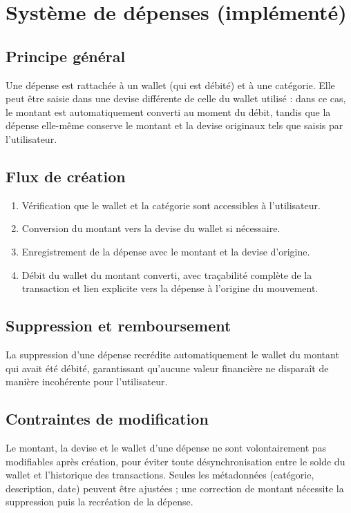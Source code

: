 \documentclass[11pt,a4paper]{article}
\begin{document}
\section{Système de dépenses (implémenté)}

\subsection{Principe général}
Une dépense est rattachée à un wallet (qui est débité) et à une catégorie. Elle peut être saisie dans une devise différente de celle du wallet utilisé : dans ce cas, le montant est automatiquement converti au moment du débit, tandis que la dépense elle-même conserve le montant et la devise originaux tels que saisis par l'utilisateur.

\subsection{Flux de création}
\begin{enumerate}[leftmargin=*]
    \item Vérification que le wallet et la catégorie sont accessibles à l'utilisateur.
    \item Conversion du montant vers la devise du wallet si nécessaire.
    \item Enregistrement de la dépense avec le montant et la devise d'origine.
    \item Débit du wallet du montant converti, avec traçabilité complète de la transaction et lien explicite vers la dépense à l'origine du mouvement.
\end{enumerate}

\subsection{Suppression et remboursement}
La suppression d'une dépense recrédite automatiquement le wallet du montant qui avait été débité, garantissant qu'aucune valeur financière ne disparaît de manière incohérente pour l'utilisateur.

\subsection{Contraintes de modification}
Le montant, la devise et le wallet d'une dépense ne sont volontairement pas modifiables après création, pour éviter toute désynchronisation entre le solde du wallet et l'historique des transactions. Seules les métadonnées (catégorie, description, date) peuvent être ajustées ; une correction de montant nécessite la suppression puis la recréation de la dépense.
\end{document}
